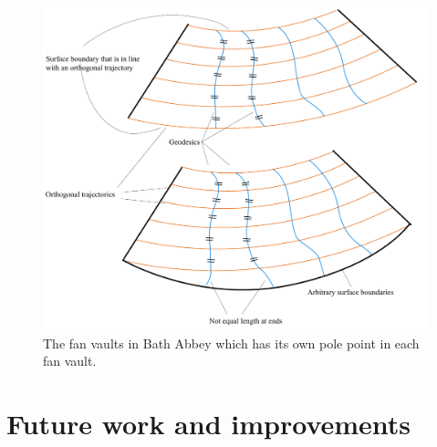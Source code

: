 \begin{figure}[H]
\centering
\includegraphics[width=1.0\linewidth ]{figure/Discussion/Boundaries.pdf}
\caption{The fan vaults in Bath Abbey which has its own pole point in each fan vault.}
\end{figure}

\section{Future work and improvements}

